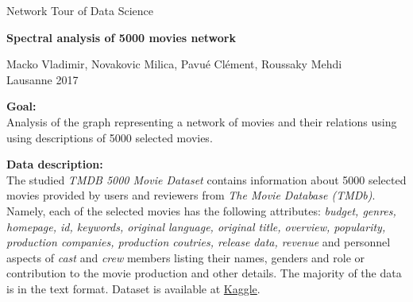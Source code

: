 \documentclass[12pt,a4paper]{report}
\begin{document}


\pagestyle{empty}
\begin{center}


Network Tour of Data Science

\medskip





\vspace{5mm}

{\LARGE\bfseries Spectral analysis of 5000 movies network}


\vspace{5mm}

{\large Macko Vladimir, Novakovic Milica, Pavu{\'e} Cl{\'e}ment, Roussaky Mehdi}
\\Lausanne 2017
\vspace{5mm}

\end{center}
 \linenumbers \textbf{Goal:}\\ Analysis of the graph representing a network of movies and their relations using  using descriptions of 5000 selected movies. 

\vspace{5mm}

\noindent \textbf{Data description:}\\ The studied \textit{TMDB 5000 Movie Dataset} contains information about 5000 selected movies provided by users and reviewers from \textit{The Movie Database (TMDb)}.  Namely, each of the selected movies has the following attributes: \textit{budget, genres, homepage, id, keywords, original language, original title, overview, popularity, production companies, production coutries, release data, revenue} and personnel aspects of \textit{cast} and \textit{crew} members listing their names, genders and role or contribution to the movie production and other details. The majority of the data is in the text format. Dataset is available at  \href{<https://www.kaggle.com/tmdb/tmdb-movie-metadata/data>}{Kaggle}.
\vspace{5mm}
\end{document}
